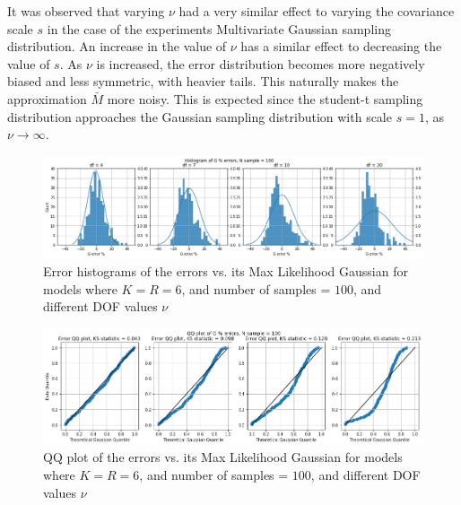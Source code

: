 It was observed that varying \(\nu\) had a very similar effect to varying the covariance scale \(s\) in the case of the experiments Multivariate Gaussian sampling distribution. An increase in the value of \(\nu\) has a similar effect to decreasing the value of \(s\). As \(\nu\) is increased, the error distribution becomes more negatively biased and less symmetric, with heavier tails. This naturally makes the approximation \(\bar{M}\) more noisy. This is expected since the student-t sampling distribution approaches the Gaussian sampling distribution with scale \(s=1\), as \(\nu \rightarrow \infty\).

\begin{figure}[!htb]
\begin{center}
    \centering
    \includegraphics[width=1.0\textwidth]{Chap6_EvaluationAndAnalysis/distribution_variation/hist_KR6_tdist.png}
\caption{Error histograms of the errors vs. its Max Likelihood Gaussian for models where \(K=R=6\), and number of samples = \(100\), and different DOF values \(\nu\)}
\label{fig:hist_KR6_tdist}
\end{center}
\end{figure}

\begin{figure}[!htb]
\begin{center}
    \centering
    \includegraphics[width=1.0\textwidth]{Chap6_EvaluationAndAnalysis/distribution_variation/QQ_KR6_tdist.png}
\caption{QQ plot of the errors vs. its Max Likelihood Gaussian for models where \(K=R=6\), and number of samples = \(100\), and different DOF values \(\nu\)}
\label{fig:QQ_KR6_tdist}
\end{center}
\end{figure}

